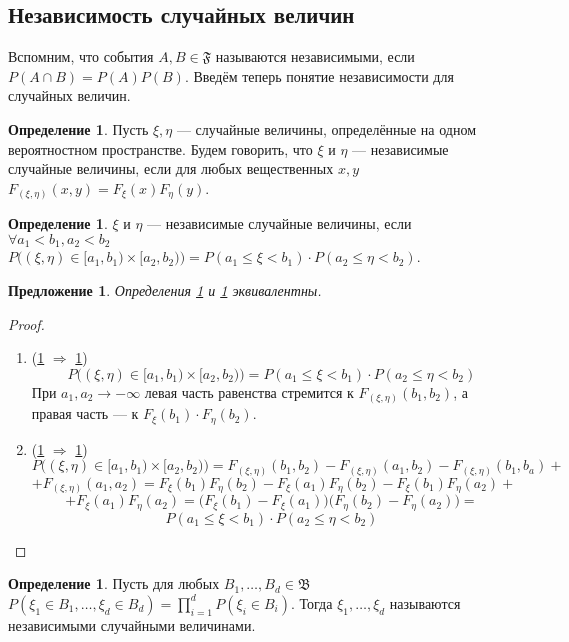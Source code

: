 \documentclass[11pt,openany,a4paper]{scrartcl}
\theoremstyle{plain}
\newtheorem{proposition}[theorem]{Предложение}
\theoremstyle{definition}
\newtheorem{definition}[theorem]{Определение}
\begin{document}
\subsection{Независимость случайных величин}

Вспомним, что события $A, B \in \mathfrak F$ называются независимыми, если
$P(A \cap B) = P(A)P(B)$. Введём теперь понятие независимости для случайных
величин.

\begin{definition}\label{random_var_independence1}
    Пусть $\xi, \eta$ — случайные величины, определённые на одном вероятностном
    пространстве. Будем говорить, что $\xi$ и $\eta$ — независимые случайные 
    величины, если для любых вещественных $x, y$
    $F_{(\xi, \eta)}(x, y) = F_\xi(x)F_\eta(y)$.
\end{definition}
\begin{definition}\label{random_var_independence2}
    $\xi$ и $\eta$ — независимые случайные величины, если
    $\forall a_1 < b_1, a_2 < b_2$ $P\big((\xi, \eta) \in [a_1, b_1) \times
    [a_2, b_2)\big) = P(a_1 \leqslant \xi < b_1) \cdot P(a_2 \leqslant
    \eta < b_2)$.
\end{definition}

\begin{proposition}
    Определения \ref{random_var_independence1} и \ref{random_var_independence2} 
    эквивалентны.
\end{proposition}
\begin{proof}
\mbox{}
    \begin{enumerate}
        \item (\ref{random_var_independence2} $\Rightarrow$
        \ref{random_var_independence1})
        $$
        P\big((\xi, \eta) \in [a_1, b_1) \times
        [a_2, b_2)\big) = P(a_1 \leqslant \xi < b_1) \cdot P(a_2 \leqslant
        \eta < b_2)
        $$
        При $a_1, a_2 \to -\infty$ левая часть равенства стремится к
        $F_{(\xi, \eta)}(b_1, b_2)$, а правая часть — к
        $F_\xi(b_1)\cdot F_\eta(b_2)$.
        \item (\ref{random_var_independence1} $\Rightarrow$
        \ref{random_var_independence2})
        $$
        P\big((\xi, \eta) \in [a_1, b_1) \times
        [a_2, b_2)\big) = F_{(\xi, \eta)}(b_1, b_2) - F_{(\xi, \eta)}(a_1, b_2)
        - F_{(\xi, \eta)}(b_1, b_a) +
        $$
        $$
        + F_{(\xi, \eta)}(a_1, a_2) = F_\xi(b_1)F_\eta(b_2) - 
        F_\xi(a_1)F_\eta(b_2) - F_\xi(b_1)F_\eta(a_2) +
        $$
        $$
        +F_\xi(a_1)F_\eta(a_2) = \big(F_\xi(b_1) - F_\xi(a_1)\big)
        \big(F_\eta(b_2) - F_\eta(a_2)\big) = 
        $$
        $$
        P(a_1 \leqslant \xi < b_1) \cdot
        P(a_2 \leqslant \eta < b_2)
        $$
    \end{enumerate}
\end{proof}
\begin{definition}\label{random_var_independence3}
    Пусть для любых $B_1,\ldots, B_d \in \mathfrak B$ $P(\xi_1 \in B_1, \ldots,
    \xi_d \in B_d) = \prod\limits_{i=1}^d P(\xi_i \in B_i)$. Тогда $\xi_1, \ldots,
    \xi_d$ называются независимыми случайными величинами.
\end{definition}
\end{document}
